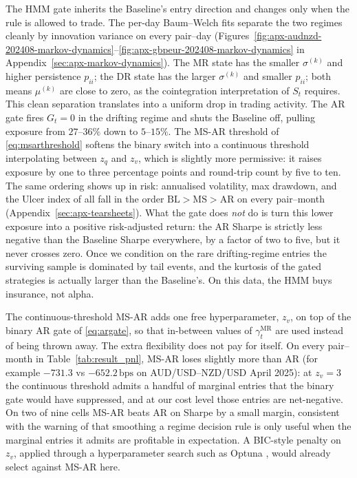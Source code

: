 The HMM gate inherits the Baseline's entry direction and changes only when the rule is allowed to trade. The per-day Baum--Welch fits \parencite{baum1970maximization} separate the two regimes cleanly by innovation variance on every pair--day (Figures~\ref{fig:apx-audnzd-202408-markov-dynamics}--\ref{fig:apx-gbpeur-202408-markov-dynamics} in Appendix~\ref{sec:apx-markov-dynamics}). The MR state has the smaller $\sigma^{(k)}$ and higher persistence $p_{ii}$; the DR state has the larger $\sigma^{(k)}$ and smaller $p_{ii}$; both means $\mu^{(k)}$ are close to zero, as the cointegration interpretation of $S_t$ requires. This clean separation translates into a uniform drop in trading activity. The AR gate fires $G_t = 0$ in the drifting regime and shuts the Baseline off, pulling exposure from $27$--$36\%$ down to $5$--$15\%$. The MS-AR threshold of \eqref{eq:msarthreshold} softens the binary switch into a continuous threshold interpolating between $z_q$ and $z_v$, which is slightly more permissive: it raises exposure by one to three percentage points and round-trip count by five to ten. The same ordering shows up in risk: annualised volatility, max drawdown, and the Ulcer index of \textcite{martin1989ulcer} all fall in the order $\text{BL} > \text{MS} > \text{AR}$ on every pair--month (Appendix~\ref{sec:apx-tearsheets}). What the gate does \emph{not} do is turn this lower exposure into a positive risk-adjusted return: the AR Sharpe is strictly less negative than the Baseline Sharpe everywhere, by a factor of two to five, but it never crosses zero. Once we condition on the rare drifting-regime entries the surviving sample is dominated by tail events, and the kurtosis of the gated strategies is actually larger than the Baseline's. On this data, the HMM buys insurance, not alpha.

The continuous-threshold MS-AR adds one free hyperparameter, $z_v$, on top of the binary AR gate of \eqref{eq:argate}, so that in-between values of $\gamma_t^{\mathrm{MR}}$ are used instead of being thrown away. The extra flexibility does not pay for itself. On every pair--month in Table~\ref{tab:result_pnl}, MS-AR loses slightly more than AR (for example $-731.3$ vs $-652.2\,\text{bps}$ on AUD/USD--NZD/USD April 2025): at $z_v = 3$ the continuous threshold admits a handful of marginal entries that the binary gate would have suppressed, and at our cost level those entries are net-negative. On two of nine cells MS-AR beats AR on Sharpe by a small margin, consistent with the warning of \textcite{cappe2005} that smoothing a regime decision rule is only useful when the marginal entries it admits are profitable in expectation. A BIC-style penalty \parencite{schwarz1978bic} on $z_v$, applied through a hyperparameter search such as Optuna \parencite{akiba2019optuna}, would already select against MS-AR here.

